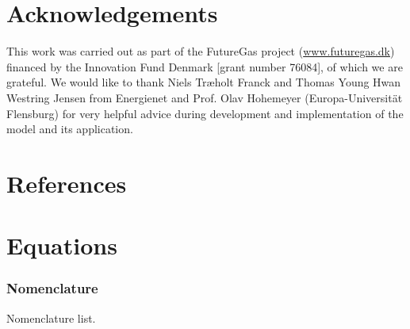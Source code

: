 \documentclass[article]{elsarticle}
\providecommand{\DIFaddtex}[1]{{\protect\color{blue}\uwave{#1}}} %
\providecommand{\DIFaddbegin}{} %
\providecommand{\DIFaddend}{} %
\providecommand{\DIFadd}[1]{\texorpdfstring{\DIFaddtex{#1}}{#1}} %
\begin{document}
\section*{Acknowledgements}
This work was carried out as part of the FutureGas project (\url{www.futuregas.dk}) financed by the Innovation Fund Denmark [grant number 76084], of which we are grateful. We would \DIFaddbegin \DIFadd{also }\DIFaddend like to thank Niels Tr\ae holt Franck and Thomas Young Hwan Westring Jensen from Energienet and Prof. Olav Hohemeyer (Europa-Universit\"at Flensburg) for very helpful advice during \DIFaddbegin \DIFadd{the }\DIFaddend development and implementation of the model and its application.

\section*{References}


\newpage
\appendix
\section{Equations}\label{app:equations}
\subsubsection{Nomenclature}\label{box:nomenclature}
\glsdisablehyper
\glsaddall
\begin{table}[h]
\begin{mdframed}
\footnotesize{
\begin{multicols}{2}
\printglossary[style=tree,type=a]
\vspace{-0.3cm}
\printglossary[style=tree,type=s]
\vspace{-0.3cm}
\printglossary[style=tree,type=v]
\vspace{-0.3cm}
\printglossary[style=tree,type=p]
\end{multicols}
}
\end{mdframed}
\caption*{Nomenclature list.}
\end{table}
\end{document}
